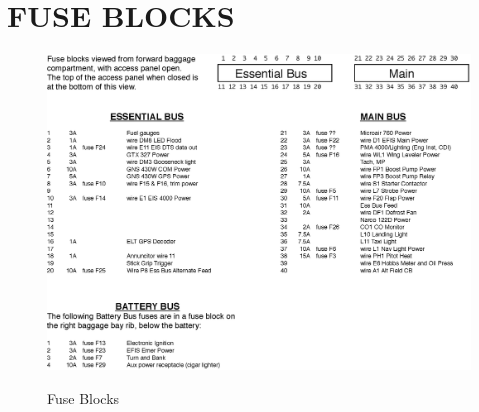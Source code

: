 \clearpage
\section{FUSE BLOCKS}
\begin{figure}
  \centering
  \includegraphics[width=1.2\textwidth, angle=90]{../Diagrams/Fuse_Blocks_POH}
  \label{fig:FuseBlocks}
  \caption{Fuse Blocks}
\end{figure}
\cleardoublepage 
